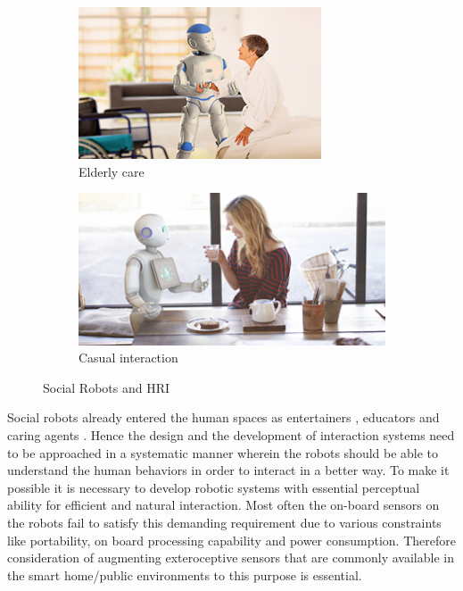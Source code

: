 \begin{figure}[H]
\begin{subfigure}[b]{0.45\textwidth}
\includegraphics[width=\textwidth]{assets/romeo_interaction.png}
\caption{Elderly care \cite{ProjectRomeo}}
\label{fig:elder_care}
\end{subfigure}
\begin{subfigure}[b]{0.45\textwidth}
\includegraphics[width=\textwidth]{assets/pepper_interaction.png}
\caption{Casual interaction \cite{PepperTheRobot}}
\label{fig:casual_hri}
\end{subfigure}
\caption[Social Robots and HRI]{Social Robots and HRI}
\label{fig:social_hri}
\end{figure}%

	Social robots already entered the human spaces as entertainers \cite{PepperTheRobot}, educators \cite{NaoRobot} and caring agents \cite{ASKNao}\cite{ProjectRomeo}. Hence the design and the development of interaction systems need to be approached in a systematic manner wherein the robots should be able to understand the human behaviors in order to interact in a better way. To make it possible it is necessary to develop robotic systems with essential perceptual ability for efficient and natural interaction. Most often the on-board sensors on the robots fail to satisfy this demanding requirement due to various constraints like portability, on board processing capability and power consumption. Therefore consideration of augmenting exteroceptive sensors that are commonly available in the smart home/public environments to this purpose is essential.
	
